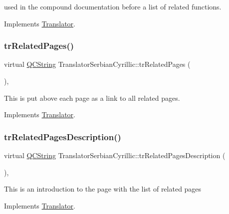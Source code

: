 used in the compound documentation before a list of related functions. 

Implements \mbox{\hyperlink{class_translator}{Translator}}.

\mbox{\label{class_translator_serbian_cyrillic_a82e680dbbdf1d8d0ccc1a14a809551d6}} 
\subsubsection{\texorpdfstring{trRelatedPages()}{trRelatedPages()}}
{\footnotesize\ttfamily virtual \mbox{\hyperlink{class_q_c_string}{Q\+C\+String}} Translator\+Serbian\+Cyrillic\+::tr\+Related\+Pages (\begin{DoxyParamCaption}{ }\end{DoxyParamCaption})\hspace{0.3cm}{\ttfamily [inline]}, {\ttfamily [virtual]}}

This is put above each page as a link to all related pages. 

Implements \mbox{\hyperlink{class_translator}{Translator}}.

\mbox{\label{class_translator_serbian_cyrillic_a61814f2e4e14f1228d982421a1f299b0}} 
\subsubsection{\texorpdfstring{trRelatedPagesDescription()}{trRelatedPagesDescription()}}
{\footnotesize\ttfamily virtual \mbox{\hyperlink{class_q_c_string}{Q\+C\+String}} Translator\+Serbian\+Cyrillic\+::tr\+Related\+Pages\+Description (\begin{DoxyParamCaption}{ }\end{DoxyParamCaption})\hspace{0.3cm}{\ttfamily [inline]}, {\ttfamily [virtual]}}

This is an introduction to the page with the list of related pages 

Implements \mbox{\hyperlink{class_translator}{Translator}}.

